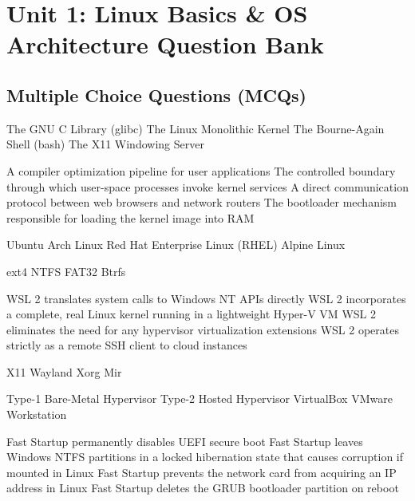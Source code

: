 \chapter{Unit 1: Linux Basics \& OS Architecture Question Bank}

\section{Multiple Choice Questions (MCQs)}

{The GNU C Library (glibc)}
{The Linux Monolithic Kernel}
{The Bourne-Again Shell (bash)}
{The X11 Windowing Server}

{A compiler optimization pipeline for user applications}
{The controlled boundary through which user-space processes invoke kernel services}
{A direct communication protocol between web browsers and network routers}
{The bootloader mechanism responsible for loading the kernel image into RAM}

{Ubuntu}
{Arch Linux}
{Red Hat Enterprise Linux (RHEL)}
{Alpine Linux}

{ext4}
{NTFS}
{FAT32}
{Btrfs}

{WSL 2 translates system calls to Windows NT APIs directly}
{WSL 2 incorporates a complete, real Linux kernel running in a lightweight Hyper-V VM}
{WSL 2 eliminates the need for any hypervisor virtualization extensions}
{WSL 2 operates strictly as a remote SSH client to cloud instances}

{X11}
{Wayland}
{Xorg}
{Mir}

{Type-1 Bare-Metal Hypervisor}
{Type-2 Hosted Hypervisor}
{VirtualBox}
{VMware Workstation}

{Fast Startup permanently disables UEFI secure boot}
{Fast Startup leaves Windows NTFS partitions in a locked hibernation state that causes corruption if mounted in Linux}
{Fast Startup prevents the network card from acquiring an IP address in Linux}
{Fast Startup deletes the GRUB bootloader partition on reboot}

